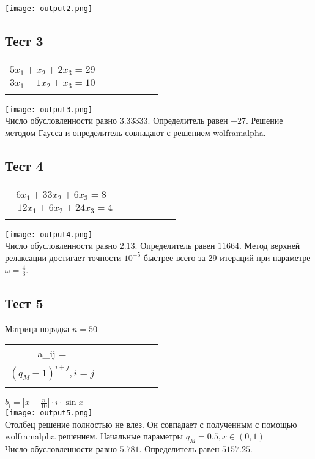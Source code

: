 \documentclass[a4paper,12pt,titlepage,finall]{article}
\begin{document}
\texttt{[image: output2.png]}
\newpage
\subsection{Тест 3}
\begin{tabular}{ccccccc}
\begin{cases}
$ x_1 + 2x_2 + 4x_3 = 31 $\\
$ 5x_1 + x_2 + 2x_3 = 29 $\\
$ 3x_1 - 1x_2 + x_3 = 10 $\\
\end{cases}
\end{tabular}

\texttt{[image: output3.png]}
\\
Число обусловленности равно $3.33333$. Определитель равен $-27$.
Решение методом Гаусса и определитель совпадают с решением wolframalpha.
\newpage
\subsection{Тест 4}
\begin{tabular}{ccccccc}
\begin{cases}
$ 24x_1 + 6x_2 + -12x_3 = 16 $\\
$ 6x_1 + 33x_2 + 6x_3 = 8 $\\
$ -12x_1 + 6x_2 + 24x_3 = 4 $\\
\end{cases}
\end{tabular}

\texttt{[image: output4.png]}\\
Число обусловленности равно $2.13$. Определитель равен $11664$.
Метод верхней релаксации достигает точности $10^{-5}$ быстрее всего за 29 итераций при параметре $\omega = \frac{4}{3}$.
\newpage
\subsection{Тест 5}
Матрица порядка $n = 50$
\begin{tabular}{ccccccc}
a_{ij} = 
\begin{cases}
$ q^{i+j}_{M} + 0.1 \cdot (j - i), i \neq j$\\
$ (q_{M} - 1)^{i + j}, i=j$\\
\end{cases}
\end{tabular}
$b_i = |x - \frac{n}{10}| \cdot i \cdot \sin{x}$\\
\texttt{[image: output5.png]}
\\
Столбец решение полностью не влез. Он совпадает с полученным с помощью wolframalpha решением.
Начальные параметры $q_M = 0.5, x \in (0, 1)$\\
Число обусловленности равно $5.781$. Определитель равен $5157.25$.
\newpage
\end{document}
